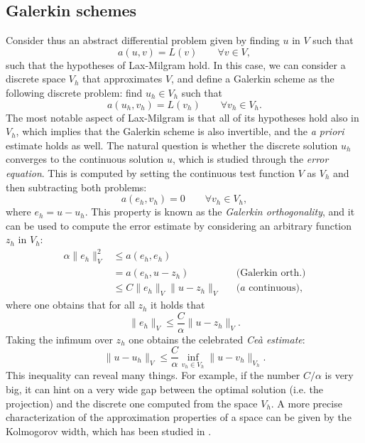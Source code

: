\documentclass{article}
\begin{document}
\subsection{Galerkin schemes}
Consider thus an abstract differential problem given by finding $u$ in $V$ such that
    $$ a(u, v) = L(v) \qquad \forall v \in V, $$
such that the hypotheses of Lax-Milgram hold. In this case, we can consider a discrete space $V_h$ that approximates $V$, and define a Galerkin scheme as the following discrete problem: find $u_h \in V_h$ such that 
    \begin{equation*}\label{eq:galerkinscheme}
    a(u_h, v_h) = L(v_h) \qquad \forall v_h \in V_h.
    \end{equation*}
The most notable aspect of Lax-Milgram is that all of its hypotheses hold also in $V_h$, which implies that the Galerkin scheme is also invertible, and the \emph{a priori} estimate holds as well. The natural question is whether the discrete solution $u_h$ converges to the continuous solution $u$, which is studied through the \emph{error equation}. This is computed by setting the continuous test function $V$ as $V_h$ and then subtracting both problems: 
    $$ a(e_h, v_h) = 0 \qquad \forall v_h \in V_h, $$
where $e_h = u - u_h$.  This property is known as the \emph{Galerkin orthogonality}, and it can be used to compute the error estimate by considering an arbitrary function $z_h$ in $V_h$:
    $$ \begin{aligned}
        \alpha \| e_h \|_V^2 &\leq a(e_h, e_h) && \\ 
                             &= a(e_h, u - z_h) && \text{(Galerkin orth.)} \\
                             &\leq C\|e_h\|_V \|u - z_h\|_V &&\text{($a$ continuous)},
        \end{aligned} $$
where one obtains that for all $z_h$ it holds that
    $$ \| e_h \|_V \leq \frac C \alpha \|u - z_h\|_V. $$
Taking the infimum over $z_h$ one obtains the celebrated \emph{Ceà estimate}: 
    $$ \| u - u_h \|_V \leq \frac C \alpha \inf_{v_h\in V_h} \|u - v_h\|_{V_h}. $$
This inequality can reveal many things. For example, if the number $C/\alpha$ is very big, it can hint on a very wide gap between the optimal solution (i.e. the projection) and the discrete one computed from the space $V_h$. A more precise characterization of the approximation properties of a space can be given by the Kolmogorov width, which has been studied in \cite{evans2009n}.
\end{document}

